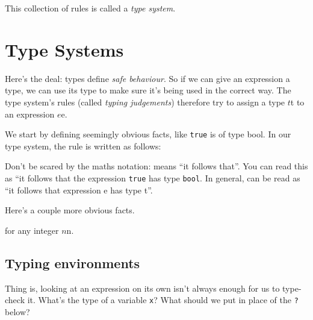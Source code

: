 This collection of rules is called a \emph{type system}.

\hypertarget{type-systems}{%
\section{\texorpdfstring{\protect\hyperlink{type-systems}{}Type
Systems}{Type Systems}}\label{type-systems}}

Here's the deal: types define \emph{safe behaviour}. So if we can give
an expression a type, we can use its type to make sure it's being used
in the correct way. The type system's rules (called \emph{typing
judgements}) therefore try to assign a type {{{\(t\)}{{{}{t}}}}} to an
expression {{{\(e\)}{{{}{e}}}}}.

We start by defining seemingly obvious facts, like \texttt{true} is of
type bool. In our type system, the rule is written as follows:

{{}}

Don't be scared by the maths notation: {{}} means
``it follows that''. You can read this as ``it follows that the
expression \texttt{true} has type \texttt{bool}. In general,
{{}} can be
read as ``it follows that expression e has type t''.

Here's a couple more obvious facts.

{{}}

{{}} for any
integer {{{\(n\)}{{{}{n}}}}}.

\hypertarget{typing-environments}{%
\subsection{\texorpdfstring{\protect\hyperlink{typing-environments}{}Typing
environments}{Typing environments}}\label{typing-environments}}

Thing is, looking at an expression on its own isn't always enough for us
to type-check it. What's the type of a variable \texttt{x}? What should
we put in place of the \texttt{?} below?

{{}}

